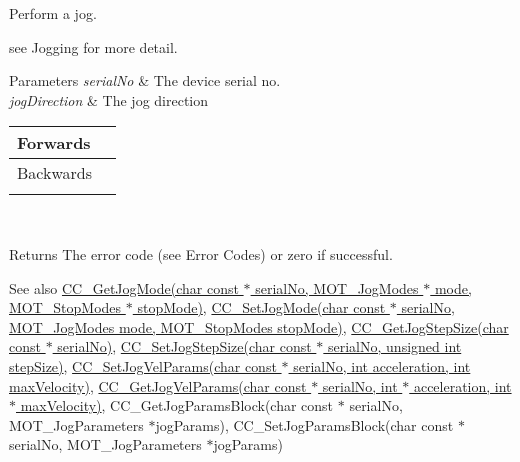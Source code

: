 Perform a jog. 

see Jogging for more detail.


\begin{DoxyParams}{Parameters}
{\em serial\+No} & The device serial no. \\
\hline
{\em jog\+Direction} & The jog direction \begin{tabularx}{\linewidth}{|*{2}{>{\raggedright\arraybackslash}X|}}\hline
Forwards&1 \\\cline{1-2}
Backwards&2 \\\cline{1-2}
\end{tabularx}
\\
\hline
\end{DoxyParams}
\begin{DoxyReturn}{Returns}
The error code (see Error Codes) or zero if successful. 
\end{DoxyReturn}
\begin{DoxySeeAlso}{See also}
\hyperlink{group___t_cube_d_c_servo_gaacfbbd68c53986e570e3bae02dc51fb4}{C\+C\+\_\+\+Get\+Jog\+Mode(char const $\ast$ serial\+No, M\+O\+T\+\_\+\+Jog\+Modes $\ast$ mode, M\+O\+T\+\_\+\+Stop\+Modes $\ast$ stop\+Mode)}, \hyperlink{group___t_cube_d_c_servo_ga013112148bf91f95324e635b4120f12b}{C\+C\+\_\+\+Set\+Jog\+Mode(char const $\ast$ serial\+No, M\+O\+T\+\_\+\+Jog\+Modes mode, M\+O\+T\+\_\+\+Stop\+Modes stop\+Mode)}, \hyperlink{group___t_cube_d_c_servo_gada32b1f60df5d55b2a0fd0e62c4464f2}{C\+C\+\_\+\+Get\+Jog\+Step\+Size(char const $\ast$ serial\+No)}, \hyperlink{group___t_cube_d_c_servo_gaeda0e9fdff1b32718f17907d131ddb41}{C\+C\+\_\+\+Set\+Jog\+Step\+Size(char const $\ast$ serial\+No, unsigned int step\+Size)}, \hyperlink{group___t_cube_d_c_servo_gabbacbf91ca765914ea7459863ed3fa9a}{C\+C\+\_\+\+Set\+Jog\+Vel\+Params(char const $\ast$ serial\+No, int acceleration, int max\+Velocity)}, \hyperlink{group___t_cube_d_c_servo_gad414392680335ffaf46aff16c7302533}{C\+C\+\_\+\+Get\+Jog\+Vel\+Params(char const $\ast$ serial\+No, int $\ast$ acceleration, int $\ast$ max\+Velocity)}, C\+C\+\_\+\+Get\+Jog\+Params\+Block(char const $\ast$ serial\+No, M\+O\+T\+\_\+\+Jog\+Parameters $\ast$jog\+Params), C\+C\+\_\+\+Set\+Jog\+Params\+Block(char const $\ast$ serial\+No, M\+O\+T\+\_\+\+Jog\+Parameters $\ast$jog\+Params)


\end{DoxySeeAlso}

\begin{DoxyCodeInclude}
\end{DoxyCodeInclude}
